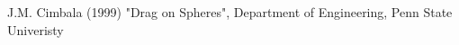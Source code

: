 \documentclass[paper=a4, fontsize=11pt, abstract=on]{scrartcl}
\numberwithin{equation}{section}		%
\numberwithin{figure}{section}			%
\numberwithin{table}{section}				%
\begin{document}
\subsection{}




\begin{thebibliography}{99} %

 J.M. Cimbala (1999)
\newblock "Drag on Spheres", Department of Engineering, Penn State Univeristy
\end{thebibliography}


\end{document}
